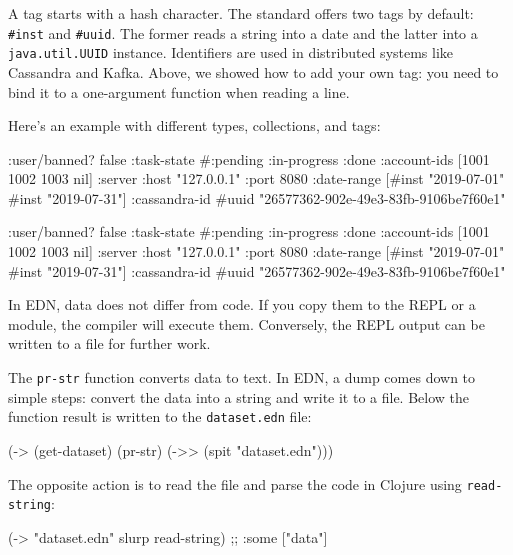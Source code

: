 
A tag starts with a hash character. The standard offers two tags by default: \verb|#inst| and \verb|#uuid|. The former reads a string into a date and the latter into a \verb|java.util.UUID| instance. Identifiers are used in distributed systems like Cassandra and Kafka. Above, we showed how to add your own tag: you need to bind it to a one-argument function when reading a line.

Here's an example with different types, collections, and tags:

\ifnarrow

\begin{clojure}
{:user/banned? false
 :task-state
 #{:pending :in-progress :done}
 :account-ids
 [1001 1002 1003 nil]
 :server
 {:host "127.0.0.1" :port 8080}
 :date-range
 [#inst "2019-07-01" #inst "2019-07-31"]
 :cassandra-id #uuid
 "26577362-902e-49e3-83fb-9106be7f60e1"}
\end{clojure}

\else

\begin{clojure}
{:user/banned? false
 :task-state #{:pending :in-progress :done}
 :account-ids [1001 1002 1003 nil]
 :server {:host "127.0.0.1" :port 8080}
 :date-range [#inst "2019-07-01" #inst "2019-07-31"]
 :cassandra-id #uuid "26577362-902e-49e3-83fb-9106be7f60e1"}
\end{clojure}

\fi

In EDN, data does not differ from code. If you copy them to the REPL or a module, the compiler will execute them. Conversely, the REPL output can be written to a file for further work.

The \verb|pr-str| function converts data to text. In EDN, a dump comes down to simple steps: convert the data into a string and write it to a file. Below the function result is written to the \verb|dataset.edn| file:

\begin{clojure}
(-> (get-dataset)
    (pr-str)
    (->> (spit "dataset.edn")))
\end{clojure}

The opposite action is to read the file and parse the code in Clojure using \verb|read-string|:

\begin{clojure}
(-> "dataset.edn" slurp read-string)
;; {:some ["data"]}
\end{clojure}


